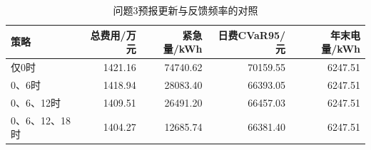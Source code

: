 \begin{table}[htbp]\centering\small\caption{问题3预报更新与反馈频率的对照}
\label{tab:updates}
\begin{tabularx}{\linewidth}{LRRRR}\toprule
策略 & 总费用/万元 & 紧急量/kWh & 日费CVaR95/元 & 年末电量/kWh\\\midrule
仅0时 & 1421.16 & 74740.62 & 70159.55 & 6247.51\\
0、6时 & 1418.94 & 28083.40 & 66393.05 & 6247.51\\
0、6、12时 & 1409.51 & 26491.20 & 66457.03 & 6247.51\\
0、6、12、18时 & 1404.27 & 12685.74 & 66381.40 & 6247.51\\
\bottomrule\end{tabularx}\end{table}